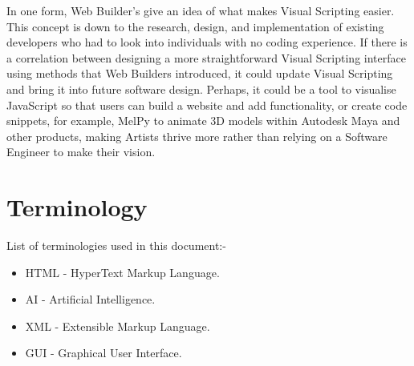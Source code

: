 \documentclass[conference]{IEEEtran}
\begin{document}
              In one form, Web Builder's give an idea of what makes Visual Scripting easier. This concept is down to the research, design, and implementation of existing developers who had to look into individuals with no coding experience. If there is a correlation between designing a more straightforward Visual Scripting interface using methods that Web Builders introduced, it could update Visual Scripting and bring it into future software design. Perhaps, it could be a tool to visualise JavaScript so that users can build a website and add functionality, or create code snippets, for example, MelPy to animate 3D models within Autodesk Maya and other products, making Artists thrive more rather than relying on a Software Engineer to make their vision.

    \section{Terminology}
      List of terminologies used in this document:-
      \begin{itemize}
        \item HTML - HyperText Markup Language.
        \item AI - Artificial Intelligence.
        \item XML - Extensible Markup Language.
        \item GUI - Graphical User Interface.
      \end{itemize}

	\renewcommand\refname{\section{Reference List}}
	\small{
    }
\end{document}

